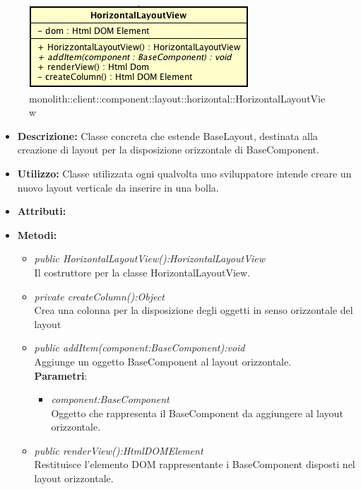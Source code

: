\label{monolith::client::component::layout::horizontal::HorizontalLayoutView}
\begin{figure}[H]
	\centering
	\includegraphics[scale=0.5]{Sezioni/SottosezioniST/img/HorizontalLayoutView.png}
	\caption{monolith::client::component::layout::horizontal::HorizontalLayoutView}
\end{figure}

\begin{itemize}
\item \textbf{Descrizione:} Classe concreta che estende BaseLayout, destinata alla creazione di layout  per la disposizione orizzontale di BaseComponent.
\item \textbf{Utilizzo:} Classe utilizzata ogni qualvolta uno sviluppatore intende creare un nuovo layout verticale da inserire in una bolla.
\item \textbf{Attributi:}
\item \textbf{Metodi:}
\begin{itemize}
\item\textit{public HorizontalLayoutView():HorizontalLayoutView}\\
Il costruttore per la classe HorizontalLayoutView.
\item \textit{private createColumn():Object}\\
Crea una colonna per la disposizione degli oggetti in senso orizzontale del layout
\item \textit{public addItem(component:BaseComponent):void}\\
Aggiunge un oggetto BaseComponent al layout orizzontale.
\\ \textbf{Parametri}: \begin{itemize}
\item \textit{component:BaseComponent}\\
Oggetto che rappresenta il BaseComponent da aggiungere al layout orizzontale.
\end{itemize}
\item \textit{public renderView():HtmlDOMElement}\\
Restituisce l'elemento DOM rappresentante i BaseComponent disposti nel layout orizzontale.
\end{itemize}
\end{itemize}